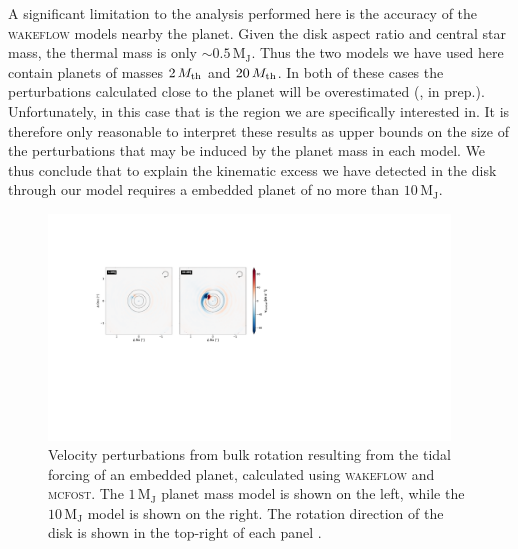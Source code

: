 A significant limitation to the analysis performed here is the accuracy of the \textsc{wakeflow} models nearby the planet.
Given the disk aspect ratio and central star mass, the thermal mass is only $\sim 0.5 \, \mathrm{M_J}$.
Thus the two models we have used here contain planets of masses $2 \, M_{\rm th}$ and $20 \, M_{\rm th}$.
In both of these cases the perturbations calculated close to the planet will be overestimated (\citeauthor{fasanoinprep.}, in prep.).
Unfortunately, in this case that is the region we are specifically interested in.
It is therefore only reasonable to interpret these results as upper bounds on the size of the perturbations that may be induced by the planet mass in each model.
We thus conclude that to explain the kinematic excess we have detected in the disk through our model requires a embedded planet of no more than $10 \, \mathrm{M_J}$.
\begin{figure}
    \centering
    \includegraphics[width = 0.95\textwidth]{figures/garg_analytics_cw.pdf}
    \caption{Velocity perturbations from bulk rotation resulting from the tidal forcing of an embedded planet, calculated using \textsc{wakeflow} and \textsc{mcfost}. The $1 \, \mathrm{M_J}$ planet mass model is shown on the left, while the $10 \, \mathrm{M_J}$ model is shown on the right. The rotation direction of the disk is shown in the top-right of each panel \citep{garg2022}.}
    \label{fig:garg_analytics}
\end{figure}

